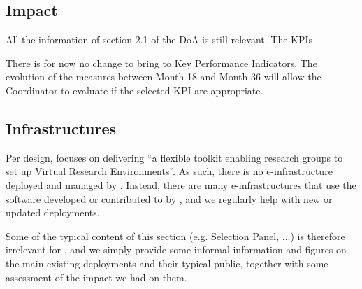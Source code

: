   \subsection{Impact}

  All the information of section 2.1 of the DoA is still relevant. The KPIs 

  There is for now no
  change to bring to Key Performance Indicators. The evolution of the measures between
  Month 18 and Month 36 will allow the Coordinator to evaluate if the selected KPI are
  appropriate.

\subsection{Infrastructures}

\label{infrastructures}

Per design, \ODK focuses on delivering ``a flexible toolkit enabling
research groups to set up Virtual Research Environments''. As such,
there is no e-infrastructure deployed and managed by \ODK. Instead,
there are many e-infrastructures that use the software developed or
contributed to by \ODK, and we regularly help with new or updated
deployments.

Some of the typical content of this section (e.g. Selection Panel,
...) is therefore irrelevant for \ODK, and we simply provide some
informal information and figures on the main existing deployments and
their typical public, together with some assessment of the impact we
had on them.

